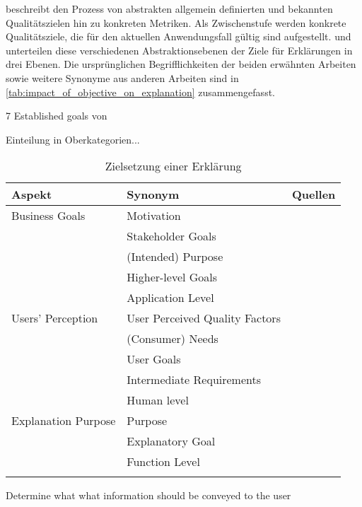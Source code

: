 \cite{schneider2012abenteuer} beschreibt den Prozess von abstrakten allgemein definierten und bekannten Qualitätszielen hin zu konkreten Metriken. Als Zwischenstufe werden konkrete Qualitätsziele, die für den aktuellen Anwendungsfall gültig sind aufgestellt. \cite{nunes_systematic_2017} und \cite{waa_evaluating_2021} unterteilen diese verschiedenen Abstraktionsebenen der Ziele für Erklärungen in drei Ebenen. Die ursprünglichen Begrifflichkeiten der beiden erwähnten Arbeiten sowie weitere Synonyme aus anderen Arbeiten sind in \autoref{tab:impact_of_objective_on_explanation} zusammengefasst.

7 Established goals von \cite{tintarev2015explaining, tintarev_designing_nodate}

Einteilung in Oberkategorien...

\begin{longtable}{|p{}|p{}|p{}|}
    \hline
    \textbf{Aspekt}     & \textbf{Synonym} & \textbf{Quellen} \\ \hline
    Business Goals      & Motivation & \cite{nunes_systematic_2017} \\
                        & Stakeholder Goals & \cite{nunes_systematic_2017} \\
                        & (Intended) Purpose & \cite{waa_evaluating_2021} \\
                        & Higher-level Goals & \cite{nunes_systematic_2017} \\
                        & Application Level & \cite{sokol_explainability_2020} \\
    \hline
    Users' Perception   & User Perceived Quality Factors & \cite{nunes_systematic_2017} \\
                        & (Consumer) Needs & \cite{ehsan_human-centered_2020} \cite{chazette_end-users_nodate} \\
                        & User Goals & \cite{ehsan_human-centered_2020} \\
                        & Intermediate Requirements & \cite{waa_evaluating_2021} \\
                        & Human level & \cite{sokol_explainability_2020} \\
                        
    \hline
    Explanation Purpose & Purpose & \cite{nunes_systematic_2017} \\
                        & Explanatory Goal & \cite{tintarev_designing_nodate} \cite{balog_measuring_2020} \\
                        & Function Level & \cite{sokol_explainability_2020} \\
    \hline
\caption{Zielsetzung einer Erklärung}
\label{tab:impact_of_objective_on_explanation}
\end{longtable}

Determine what what information should be conveyed to the user \cite{nunes_systematic_2017}